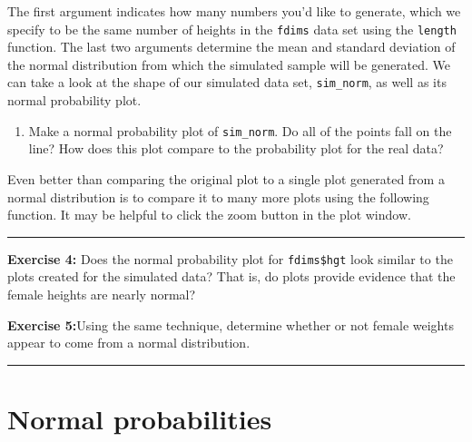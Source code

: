 \documentclass[]{book}
\newenvironment{Shaded}{\begin{snugshade}}{\end{snugshade}}
\newcommand{\KeywordTok}[1]{\textcolor[rgb]{0.13,0.29,0.53}{\textbf{#1}}}
\newcommand{\NormalTok}[1]{#1}
\newcommand{\OperatorTok}[1]{\textcolor[rgb]{0.81,0.36,0.00}{\textbf{#1}}}
\providecommand{\tightlist}{%
  \setlength{\itemsep}{0pt}\setlength{\parskip}{0pt}}
\theoremstyle{definition}
\theoremstyle{definition}
\theoremstyle{definition}
\theoremstyle{remark}
\begin{document}
The first argument indicates how many numbers you'd like to generate,
which we specify to be the same number of heights in the \texttt{fdims}
data set using the \texttt{length} function. The last two arguments
determine the mean and standard deviation of the normal distribution
from which the simulated sample will be generated. We can take a look at
the shape of our simulated data set, \texttt{sim\_norm}, as well as its
normal probability plot.

\begin{enumerate}
\def\labelenumi{\arabic{enumi}.}
\setcounter{enumi}{2}
\tightlist
\item
  Make a normal probability plot of \texttt{sim\_norm}. Do all of the
  points fall on the line? How does this plot compare to the probability
  plot for the real data?
\end{enumerate}

Even better than comparing the original plot to a single plot generated
from a normal distribution is to compare it to many more plots using the
following function. It may be helpful to click the zoom button in the
plot window.

\begin{Shaded}
\end{Shaded}

\begin{center}\rule{0.5\linewidth}{\linethickness}\end{center}

\textbf{Exercise 4:} Does the normal probability plot for
\texttt{fdims\$hgt} look similar to the plots created for the simulated
data? That is, do plots provide evidence that the female heights are
nearly normal?

\textbf{Exercise 5:}Using the same technique, determine whether or not
female weights appear to come from a normal distribution.

\begin{center}\rule{0.5\linewidth}{\linethickness}\end{center}

\hypertarget{normal-probabilities}{%
\section{Normal probabilities}\label{normal-probabilities}}
\end{document}
